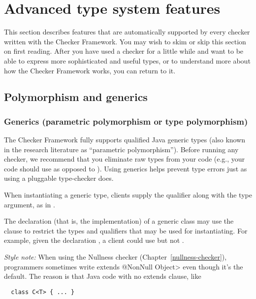 \htmlhr
\chapter{Advanced type system features\label{advanced-type-system-features}}

This section describes features that are automatically supported by every
checker written with the Checker Framework.
You may wish to skim or skip this section on first reading.  After you have
used a checker for a little while and want to be able to express more
sophisticated and useful types, or to understand more about how the Checker
Framework works, you can return to it.


\section{Polymorphism and generics\label{polymorphism}}

\subsection{Generics (parametric polymorphism or type polymorphism)\label{generics}}

The Checker Framework fully supports 
qualified Java generic types (also known in the research literature as ``parametric
polymorphism'').  Before running any checker, we recommend that you eliminate
raw types from your code (e.g., your code should use  as
opposed to ).
Using generics helps prevent type errors just as using a pluggable
type-checker does.

When instantiating a generic type, 
clients supply the qualifier along with the type argument, as in
.

The declaration (that is, the implementation) of a generic class may use
the  clause to restrict the types and qualifiers that may be
used for instantiating.  For example, given the declaration , a client could use
 but not .

\emph{Style note:}
When using the Nullness checker (Chapter~\ref{nullness-checker}),
programmers sometimes write \<extends @NonNull Object> even though it's the 
default.
The reason is that Java code with no extends clause, like 

\begin{Verbatim}
  class C<T> { ... }
\end{Verbatim}

